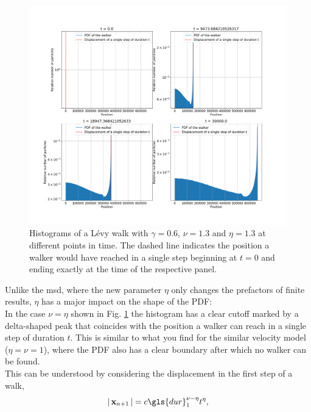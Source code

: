 \begin{figure}[!htb] %
\begin{center}
\includegraphics[width=1\textwidth]{pics/histogramShapeEtaEqual.png}
\caption{Histograms of a L\'evy walk with $\gamma =0.6$, $\nu = 1.3$ and $\eta =1.3$ at different points in time. The dashed line indicates the position a walker would have reached in a single step beginning at $t=0$ and ending exactly at the time of the respective panel.
\label{fig:histogramShapeEtaEqual} }
\end{center}
\end{figure} 
%
Unlike the \gls{msd}, where the new parameter $\eta$ only changes the prefactors of finite results,  $\eta$ has a major impact on the shape of the \gls{PDF}: \\
In the case $\nu=\eta$ shown in Fig. \ref{fig:histogramShapeEtaEqual} the histogram has a clear cutoff marked by a delta-shaped peak that coincides with the position a walker can reach in a single step of duration $t$. This is similar to what you find for the similar velocity model ($\eta=\nu=1$),  where the \gls{PDF} also has a clear boundary after which no walker can be found. \\
This can be understood by considering the displacement in the first step of a walk,
%
\begin{align}
\abs{\ve{x}_{n+1}} = c \gls{dur}_{1}^{\nu-\eta} t^{\eta} , \label{eqn:step}
\end{align}
